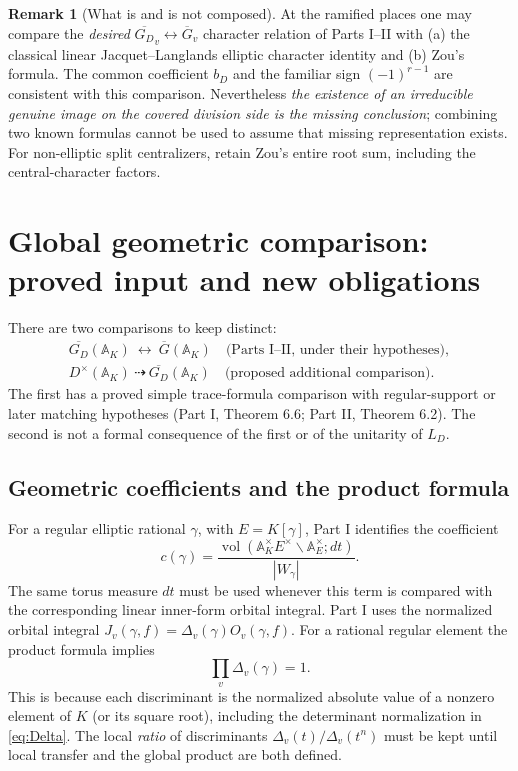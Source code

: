 \documentclass[11pt]{article}
\newcommand{\A}{\mathbb A}
\newcommand{\vol}{\operatorname{vol}}
\newcommand{\Gb}{\overline G}
\newcommand{\GDb}{\overline{G_D}}
\theoremstyle{plain}
\theoremstyle{definition}
\newtheorem{remark}[theorem]{Remark}
\begin{document}
\begin{remark}[What is and is not composed]
At the ramified places one may compare the \emph{desired}
$\GDb_v\leftrightarrow\Gb_v$ character relation of Parts I--II
with (a) the classical linear Jacquet--Langlands elliptic
character identity and (b) Zou's formula.  The common coefficient
$b_D$ and the familiar sign $(-1)^{r-1}$ are consistent with
this comparison.  Nevertheless \emph{the existence of an
irreducible genuine image on the covered division side is the
missing conclusion}; combining two known formulas cannot be
used to assume that missing representation exists.
For non-elliptic split centralizers, retain Zou's entire
root sum, including the central-character factors.
\end{remark}

\section{Global geometric comparison: proved input and new obligations}\label{sec:geometric}
There are two comparisons to keep distinct:
\begin{equation}\label{eq:twocomparisons}
 \begin{gathered}
 \GDb(\A_K)\ \longleftrightarrow\ \Gb(\A_K)
 \quad\text{(Parts I--II, under their hypotheses)},\\[3pt]
 D^\times(\A_K)\ \dashrightarrow\ \GDb(\A_K)
 \quad\text{(proposed additional comparison)}.
 \end{gathered}
\end{equation}
The first has a proved simple trace-formula comparison with
regular-support or later matching hypotheses (Part I, Theorem 6.6;
Part II, Theorem 6.2).
The second is not a formal consequence of the first or of the
unitarity of $L_D$.

\subsection{Geometric coefficients and the product formula}
For a regular elliptic rational $\gamma$, with $E=K[\gamma]$,
Part I identifies the coefficient
\[
 c(\gamma)=\frac{\vol(\A_K^\times E^\times\backslash
 \A_E^\times;dt)}{|W_\gamma|}.
\]
The same torus measure $dt$ must be used whenever this term
is compared with the corresponding linear inner-form orbital integral.
Part I uses the normalized orbital integral
$J_v(\gamma,f)=\Delta_v(\gamma)O_v(\gamma,f)$.
For a rational regular element the product formula implies
\begin{equation}\label{eq:discprod}
 \prod_v\Delta_v(\gamma)=1.
\end{equation}
This is because each discriminant is the normalized absolute
value of a nonzero element of $K$ (or its square root), including
the determinant normalization in \eqref{eq:Delta}.
The local \emph{ratio} of discriminants
$\Delta_v(t)/\Delta_v(t^n)$ must be kept until local transfer
and the global product are both defined.
\end{document}
